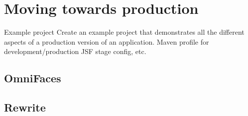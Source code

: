 %

\chapter{Moving towards production}
\begin{TODO}{Example project}
	Create an example project that demonstrates all the different aspects of a production version of an application.
	Maven profile for development/production JSF stage config, etc.
\end{TODO}

\section{OmniFaces}

\section{Rewrite}


